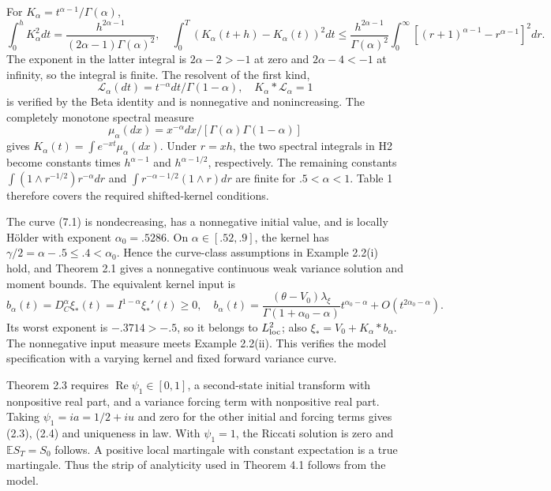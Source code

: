 \documentclass[11pt,a4paper]{article}
\begin{document}
For \(K_\alpha=t^{\alpha-1}/\Gamma(\alpha)\),
\begin{equation*}\tag{A.4}
\int_0^hK_\alpha^2dt=
\frac{h^{2\alpha-1}}{(2\alpha-1)\Gamma(\alpha)^2},\quad
\int_0^T(K_\alpha(t+h)-K_\alpha(t))^2dt
\le\frac{h^{2\alpha-1}}{\Gamma(\alpha)^2}
\int_0^\infty[(r+1)^{\alpha-1}-r^{\alpha-1}]^2dr.
\end{equation*}
The exponent in the latter integral is \(2\alpha-2>-1\) at zero and \(2\alpha-4<-1\) at infinity, so the integral is finite. The resolvent of the first kind,
\begin{equation*}\tag{A.5}
\mathcal L_\alpha(dt)=t^{-\alpha}dt/\Gamma(1-\alpha),\quad
K_\alpha*\mathcal L_\alpha=1
\end{equation*}
is verified by the Beta identity and is nonnegative and nonincreasing. The completely monotone spectral measure
\begin{equation*}\tag{A.6}
\mu_\alpha(dx)=x^{-\alpha}dx/
[\Gamma(\alpha)\Gamma(1-\alpha)]
\end{equation*}
gives \(K_\alpha(t)=\int e^{-xt}\mu_\alpha(dx)\). Under \(r=xh\), the two spectral integrals in H2 become constants times \(h^{\alpha-1}\) and \(h^{\alpha-1/2}\), respectively. The remaining constants
\(\int(1\wedge r^{-1/2})r^{-\alpha}dr\) and
\(\int r^{-\alpha-1/2}(1\wedge r)dr\) are finite for \(.5<\alpha<1\). Table 1 therefore covers the required shifted-kernel conditions.

The curve (7.1) is nondecreasing, has a nonnegative initial value, and is locally Hölder with exponent \(\alpha_0=.5286\). On \(\alpha\in[.52,.9]\), the kernel has \(\gamma/2=\alpha-.5\le.4<\alpha_0\). Hence the curve-class assumptions in Example 2.2(i) hold, and Theorem 2.1 gives a nonnegative continuous weak variance solution and moment bounds. The equivalent kernel input is
\begin{equation*}\tag{A.7}
b_\alpha(t)=D_C^\alpha\xi_*(t)=I^{1-\alpha}\xi_*'(t)\ge0,\quad
b_\alpha(t)=
\frac{(\theta-V_0)\lambda_\xi}{\Gamma(1+\alpha_0-\alpha)}
t^{\alpha_0-\alpha}+O(t^{2\alpha_0-\alpha}).
\end{equation*}
Its worst exponent is \(-.3714>-.5\), so it belongs to \(L^2_{\rm loc}\); also \(\xi_*=V_0+K_\alpha*b_\alpha\). The nonnegative input measure meets Example 2.2(ii). This verifies the model specification with a varying kernel and fixed forward variance curve.

Theorem 2.3 requires \(\operatorname{Re}\psi_1\in[0,1]\), a second-state initial transform with nonpositive real part, and a variance forcing term with nonpositive real part. Taking \(\psi_1=ia=1/2+iu\) and zero for the other initial and forcing terms gives (2.3), (2.4) and uniqueness in law. With \(\psi_1=1\), the Riccati solution is zero and \(\mathbb E S_T=S_0\) follows. A positive local martingale with constant expectation is a true martingale. Thus the strip of analyticity used in Theorem 4.1 follows from the model.
\end{document}

